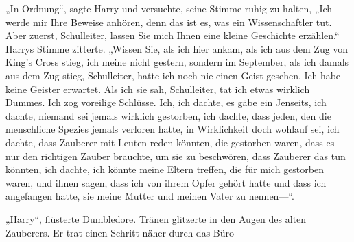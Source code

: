 „In Ordnung“, sagte Harry und versuchte, seine Stimme ruhig zu halten, „Ich werde mir Ihre Beweise anhören, denn das ist es, was ein Wissenschaftler tut. Aber zuerst, Schulleiter, lassen Sie mich Ihnen eine kleine Geschichte erzählen.“ Harrys Stimme zitterte. „Wissen Sie, als ich hier ankam, als ich aus dem Zug von King's Cross stieg, ich meine nicht gestern, sondern im September, als ich damals aus dem Zug stieg, Schulleiter, hatte ich noch nie einen Geist gesehen. Ich habe keine Geister erwartet. Als ich sie sah, Schulleiter, tat ich etwas wirklich Dummes. Ich zog voreilige Schlüsse. Ich, ich dachte, es gäbe ein Jenseits, ich dachte, niemand sei jemals wirklich gestorben, ich dachte, dass jeden, den die menschliche Spezies jemals verloren hatte, in Wirklichkeit doch wohlauf sei, ich dachte, dass Zauberer mit Leuten reden könnten, die gestorben waren, dass es nur den richtigen Zauber brauchte, um sie zu beschwören, dass Zauberer das tun könnten, ich dachte, ich könnte meine Eltern treffen, die für mich gestorben waren, und ihnen sagen, dass ich von ihrem Opfer gehört hatte und dass ich angefangen hatte, sie meine Mutter und meinen Vater zu nennen—“.

„Harry“, flüsterte Dumbledore. Tränen glitzerte in den Augen des alten Zauberers. Er trat einen Schritt näher durch das Büro—

